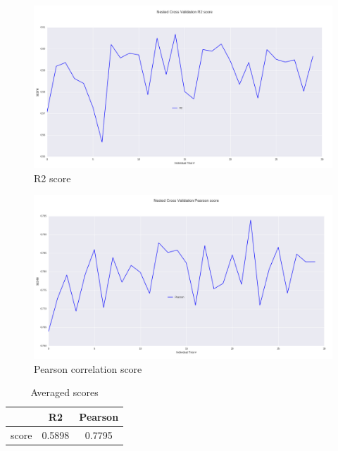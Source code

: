 \documentclass[10pt, a4paper]{article}
\begin{document}
\begin{table}[h!]
\begin{figure}[h!]
\begin{center}
	\centering
	\includegraphics[scale=0.36]{R2.png}
	\caption{R2 score}
\end{center}
\end{figure}


\begin{figure}[h!]
\begin{center}
	\centering
	\includegraphics[scale=0.36]{Pearson.png}
	\caption{Pearson correlation score}
\end{center}
\end{figure}

\begin{table}
\caption{Averaged scores}
\label{tab:narrow-table}
\begin{center}
\begin{tabular}{ccc}
\toprule
& R2 & Pearson\\
\midrule
score & 0.5898 & 0.7795 \\
\bottomrule
\end{tabular}
\end{center}
\end{table}


\end{table}
\end{document}
